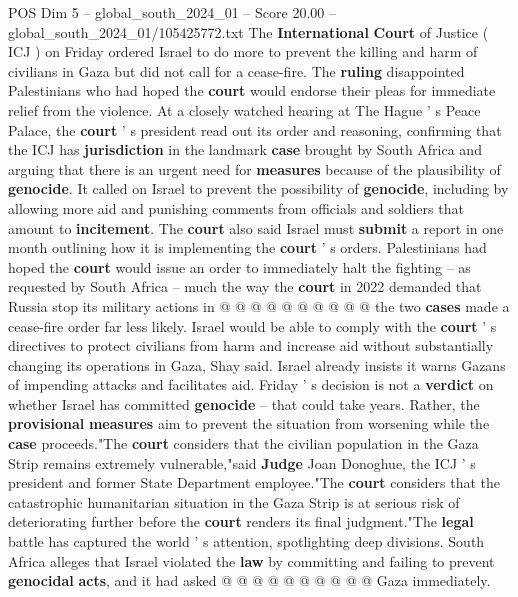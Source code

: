 \begin{textsample}{POS Dim 5 – global\_south\_2024\_01 – Score 20.00 – global\_south\_2024\_01/105425772.txt}  \label{ex:f5_pos_016}
The \textbf{International} \textbf{Court} of Justice ( ICJ ) on Friday ordered Israel to do more to prevent the killing and harm of civilians in Gaza but did not call for a cease-fire.
The \textbf{ruling} disappointed Palestinians who had hoped the \textbf{court} would endorse their pleas for immediate relief from the violence.
At a closely watched hearing at The Hague ' s Peace Palace, the \textbf{court} ' s president read out its order and reasoning, confirming that the ICJ has \textbf{jurisdiction} in the landmark \textbf{case} brought by South Africa and arguing that there is an urgent need for \textbf{measures} because of the plausibility of \textbf{genocide}.
It called on Israel to prevent the possibility of \textbf{genocide}, including by allowing more aid and punishing comments from officials and soldiers that amount to \textbf{incitement}.
The \textbf{court} also said Israel must \textbf{submit} a report in one month outlining how it is implementing the \textbf{court} ' s orders.
Palestinians had hoped the \textbf{court} would issue an order to immediately halt the fighting -- as requested by South Africa -- much the way the \textbf{court} in 2022 demanded that Russia stop its military actions in @ @ @ @ @ @ @ @ @ @ the two \textbf{cases} made a cease-fire order far less likely.
Israel would be able to comply with the \textbf{court} ' s directives to protect civilians from harm and increase aid without substantially changing its operations in Gaza, Shay said.
Israel already insists it warns Gazans of impending attacks and facilitates aid.
Friday ' s decision is not a \textbf{verdict} on whether Israel has committed \textbf{genocide} -- that could take years.
Rather, the \textbf{provisional} \textbf{measures} aim to prevent the situation from worsening while the \textbf{case} proceeds."The \textbf{court} considers that the civilian population in the Gaza Strip remains extremely vulnerable,"said \textbf{Judge} Joan Donoghue, the ICJ ' s president and former State Department employee."The \textbf{court} considers that the catastrophic humanitarian situation in the Gaza Strip is at serious risk of deteriorating further before the \textbf{court} renders its final judgment."The \textbf{legal} battle has captured the world ' s attention, spotlighting deep divisions.
South Africa alleges that Israel violated the \textbf{law} by committing and failing to prevent \textbf{genocidal} \textbf{acts}, and it had asked @ @ @ @ @ @ @ @ @ @ Gaza immediately.

\end{textsample}
